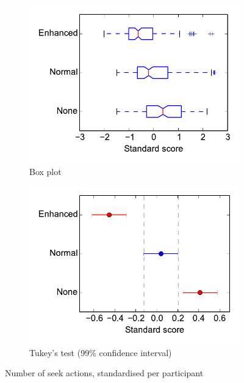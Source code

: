 \begin{figure}[ht]
\centering
\begin{subfigure}{.5\textwidth}
  \centering
  \includegraphics[width=\textwidth]{figs/seek-std.pdf}
  \caption{Box plot}
  \label{fig:seekbox}
\end{subfigure}%
\begin{subfigure}{.5\textwidth}
  \centering
  \includegraphics[width=\linewidth]{figs/seek-std-tukey99.pdf}
  \caption{Tukey's test (99\% confidence interval)}
  \label{fig:seektukey}
\end{subfigure}
\caption{Number of seek actions, standardised per participant}
\label{fig:seek}
\end{figure}

